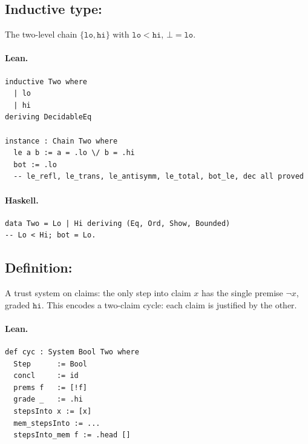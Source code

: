 \documentclass[11pt,a4paper]{article}
\begin{document}
\subsection{Inductive type: }

\begin{defn}
The two-level chain $\{\mathtt{lo}, \mathtt{hi}\}$ with $\mathtt{lo} < \mathtt{hi}$,
$\bot = \mathtt{lo}$.
\end{defn}

\paragraph{Lean.}
\begin{lstlisting}[style=lean]
inductive Two where
  | lo
  | hi
deriving DecidableEq

instance : Chain Two where
  le a b := a = .lo \/ b = .hi
  bot := .lo
  -- le_refl, le_trans, le_antisymm, le_total, bot_le, dec all proved
\end{lstlisting}

\paragraph{Haskell.}
\begin{lstlisting}[style=haskell]
data Two = Lo | Hi deriving (Eq, Ord, Show, Bounded)
-- Lo < Hi; bot = Lo.
\end{lstlisting}


\subsection{Definition: }

\begin{defn}
A trust system on  claims: the only step into claim $x$ has the
single premise $\neg x$, graded $\mathtt{hi}$.  This encodes a two-claim
cycle: each claim is justified by the other.
\end{defn}

\paragraph{Lean.}
\begin{lstlisting}[style=lean]
def cyc : System Bool Two where
  Step      := Bool
  concl     := id
  prems f   := [!f]
  grade _   := .hi
  stepsInto x := [x]
  mem_stepsInto := ...
  stepsInto_mem f := .head []
\end{lstlisting}
\end{document}
